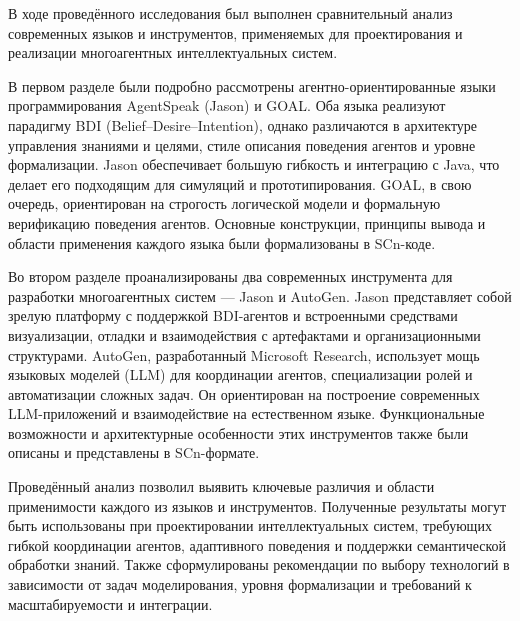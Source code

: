 
В ходе проведённого исследования был выполнен сравнительный анализ современных языков и инструментов, применяемых для проектирования и реализации многоагентных интеллектуальных систем.

В первом разделе были подробно рассмотрены агентно-ориентированные языки программирования AgentSpeak (Jason) и GOAL. Оба языка реализуют парадигму BDI (Belief–Desire–Intention), однако различаются в архитектуре управления знаниями и целями, стиле описания поведения агентов и уровне формализации. Jason обеспечивает большую гибкость и интеграцию с Java, что делает его подходящим для симуляций и прототипирования. GOAL, в свою очередь, ориентирован на строгость логической модели и формальную верификацию поведения агентов. Основные конструкции, принципы вывода и области применения каждого языка были формализованы в SCn-коде.

Во втором разделе проанализированы два современных инструмента для разработки многоагентных систем — Jason и AutoGen. Jason представляет собой зрелую платформу с поддержкой BDI-агентов и встроенными средствами визуализации, отладки и взаимодействия с артефактами и организационными структурами. AutoGen, разработанный Microsoft Research, использует мощь языковых моделей (LLM) для координации агентов, специализации ролей и автоматизации сложных задач. Он ориентирован на построение современных LLM-приложений и взаимодействие на естественном языке. Функциональные возможности и архитектурные особенности этих инструментов также были описаны и представлены в SCn-формате.

Проведённый анализ позволил выявить ключевые различия и области применимости каждого из языков и инструментов. Полученные результаты могут быть использованы при проектировании интеллектуальных систем, требующих гибкой координации агентов, адаптивного поведения и поддержки семантической обработки знаний. Также сформулированы рекомендации по выбору технологий в зависимости от задач моделирования, уровня формализации и требований к масштабируемости и интеграции.